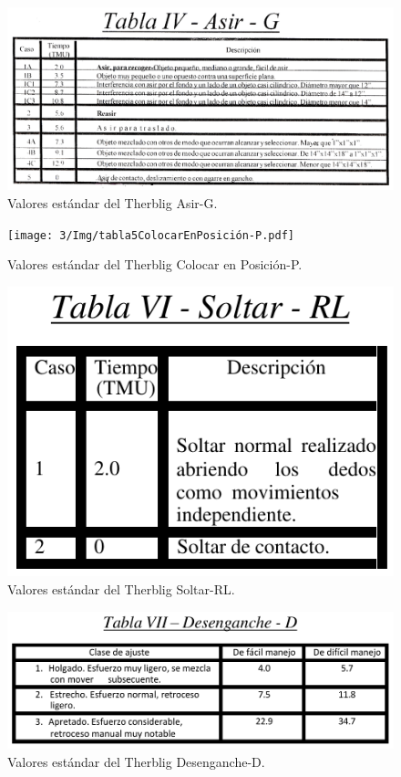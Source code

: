     \begin{figure}[H]
        \centering
        \includegraphics[scale=0.4]{3/Img/tabla4Asir-G.pdf}
        \caption{Valores estándar del Therblig Asir-G.}
        \label{fig:tabla4Asir-G}
    \end{figure}
    \begin{figure}[H]
        \centering
        \texttt{[image: 3/Img/tabla5ColocarEnPosición-P.pdf]}
        \caption{Valores estándar del Therblig Colocar en Posición-P.}
        \label{fig:tabla5ColocarEnPosición-P}
    \end{figure}
    \begin{figure}[H]    
        \centering
        \includegraphics[scale=0.6]{3/Img/tabla6Soltar-RL.pdf}
        \caption{Valores estándar del Therblig Soltar-RL.}
        \label{fig:tabla6Soltar-RL}
    \end{figure}
    \begin{figure}[H]
        \centering
        \includegraphics[scale=0.5]{3/Img/tabla7Desenganche-D.pdf}
        \caption{Valores estándar del Therblig Desenganche-D.}
        \label{fig:tabla7Desenganche-D}
    \end{figure}
